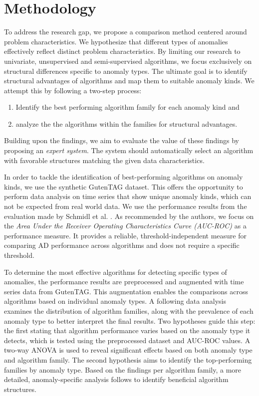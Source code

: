 \chapter{Methodology}
To address the research gap, we propose a comparison method centered around problem characteristics. We hypothesize that different types of anomalies effectively reflect distinct problem characteristics. By limiting our research to univariate, unsupervised and semi-supervised algorithms, we focus exclusively on structural differences specific to anomaly types. The ultimate goal is to identify structural advantages of algorithms and map them to suitable anomaly kinds. We attempt this by following a two-step process:
\begin{enumerate}
    \item Identify the best performing algorithm family for each anomaly kind and
    \item analyze the the algorithms within the families for structural advantages.
\end{enumerate}

Building upon the findings, we aim to evaluate the value of these findings by proposing an \textit{expert system}. The system should automatically select an algorithm with favorable structures matching the given data characteristics. 

In order to tackle the identification of best-performing algorithms on anomaly kinds, we use the synthetic GutenTAG dataset. This offers the opportunity to perform data analysis on time series that show unique anomaly kinds, which can not be expected from real world data.
We use the performance results from the evaluation made by Schmidl et al. \cite{Schmidl2022}. As recommended by the authors, we focus on the \textit{Area Under the Receiver Operating Characteristics Curve (AUC-ROC)} as a performance measure. It provides a reliable, threshold-independent measure for comparing AD performance across algorithms and does not require a specific threshold.

To determine the most effective algorithms for detecting specific types of anomalies, the performance results are preprocessed and augmented with time series data from GutenTAG. This augmentation enables the comparisons across algorithms based on individual anomaly types. 
A following data analysis examines the distribution of algorithm families, along with the prevalence of each anomaly type to better interpret the final results. 
Two hypotheses guide this step: the first stating that algorithm performance varies based on the anomaly type it detects, which is tested using the preprocessed dataset and AUC-ROC values. A two-way ANOVA is used to reveal significant effects based on both anomaly type and algorithm family. The second hypothesis aims to identify the top-performing families by anomaly type.
Based on the findings per algorithm family, a more detailed, anomaly-specific analysis follows to identify beneficial algorithm structures.

